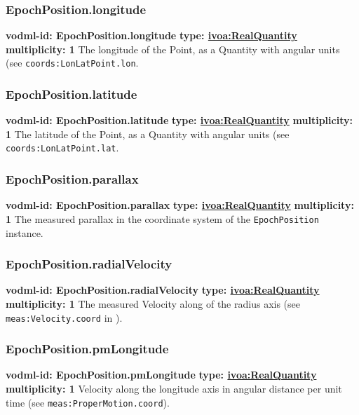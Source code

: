     \subsubsection{EpochPosition.longitude}
      \textbf{vodml-id: EpochPosition.longitude} \newline
      \textbf{type: \hyperref[sect:ivoa]{ivoa:RealQuantity}} \newline
      \textbf{multiplicity: 1} \newline
      The longitude of the Point, as a Quantity with angular units (see \texttt{coords:LonLatPoint.lon}.

    \subsubsection{EpochPosition.latitude}
      \textbf{vodml-id: EpochPosition.latitude} \newline
      \textbf{type: \hyperref[sect:ivoa]{ivoa:RealQuantity}} \newline
      \textbf{multiplicity: 1} \newline
      The latitude of the Point, as a Quantity with angular units (see \texttt{coords:LonLatPoint.lat}.

    \subsubsection{EpochPosition.parallax}
      \textbf{vodml-id: EpochPosition.parallax} \newline
      \textbf{type: \hyperref[sect:ivoa]{ivoa:RealQuantity}} \newline
      \textbf{multiplicity: 1} \newline
      The measured parallax in the coordinate system of the \texttt{EpochPosition} instance.

    \subsubsection{EpochPosition.radialVelocity}
      \textbf{vodml-id: EpochPosition.radialVelocity} \newline
      \textbf{type: \hyperref[sect:ivoa]{ivoa:RealQuantity}} \newline
      \textbf{multiplicity: 1} \newline
      The measured Velocity along of the radius axis (see \texttt{meas:Velocity.coord} in \cite{2022ivoa.spec.1004R}).

    \subsubsection{EpochPosition.pmLongitude}
      \textbf{vodml-id: EpochPosition.pmLongitude} \newline
      \textbf{type: \hyperref[sect:ivoa]{ivoa:RealQuantity}} \newline
      \textbf{multiplicity: 1} \newline
      Velocity along the longitude axis in angular distance per unit time (see \texttt{meas:ProperMotion.coord}).

